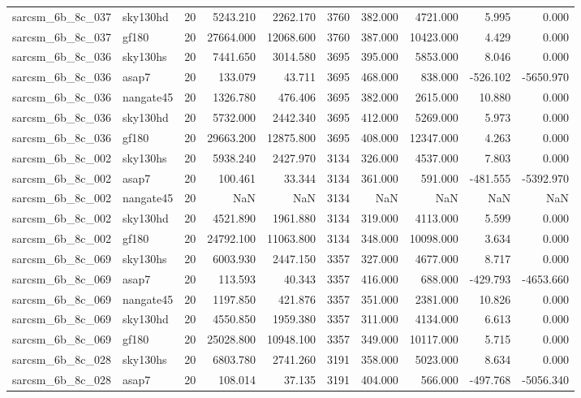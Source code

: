 \begin{longtable}{llrrrrrrrr}
sarcsm\_6b\_8c\_037 & sky130hd & 20 & 5243.210 & 2262.170 & 3760 & 382.000 & 4721.000 & 5.995 & 0.000 \\
sarcsm\_6b\_8c\_037 & gf180 & 20 & 27664.000 & 12068.600 & 3760 & 387.000 & 10423.000 & 4.429 & 0.000 \\
sarcsm\_6b\_8c\_036 & sky130hs & 20 & 7441.650 & 3014.580 & 3695 & 395.000 & 5853.000 & 8.046 & 0.000 \\
sarcsm\_6b\_8c\_036 & asap7 & 20 & 133.079 & 43.711 & 3695 & 468.000 & 838.000 & -526.102 & -5650.970 \\
sarcsm\_6b\_8c\_036 & nangate45 & 20 & 1326.780 & 476.406 & 3695 & 382.000 & 2615.000 & 10.880 & 0.000 \\
sarcsm\_6b\_8c\_036 & sky130hd & 20 & 5732.000 & 2442.340 & 3695 & 412.000 & 5269.000 & 5.973 & 0.000 \\
sarcsm\_6b\_8c\_036 & gf180 & 20 & 29663.200 & 12875.800 & 3695 & 408.000 & 12347.000 & 4.263 & 0.000 \\
sarcsm\_6b\_8c\_002 & sky130hs & 20 & 5938.240 & 2427.970 & 3134 & 326.000 & 4537.000 & 7.803 & 0.000 \\
sarcsm\_6b\_8c\_002 & asap7 & 20 & 100.461 & 33.344 & 3134 & 361.000 & 591.000 & -481.555 & -5392.970 \\
sarcsm\_6b\_8c\_002 & nangate45 & 20 & NaN & NaN & 3134 & NaN & NaN & NaN & NaN \\
sarcsm\_6b\_8c\_002 & sky130hd & 20 & 4521.890 & 1961.880 & 3134 & 319.000 & 4113.000 & 5.599 & 0.000 \\
sarcsm\_6b\_8c\_002 & gf180 & 20 & 24792.100 & 11063.800 & 3134 & 348.000 & 10098.000 & 3.634 & 0.000 \\
sarcsm\_6b\_8c\_069 & sky130hs & 20 & 6003.930 & 2447.150 & 3357 & 327.000 & 4677.000 & 8.717 & 0.000 \\
sarcsm\_6b\_8c\_069 & asap7 & 20 & 113.593 & 40.343 & 3357 & 416.000 & 688.000 & -429.793 & -4653.660 \\
sarcsm\_6b\_8c\_069 & nangate45 & 20 & 1197.850 & 421.876 & 3357 & 351.000 & 2381.000 & 10.826 & 0.000 \\
sarcsm\_6b\_8c\_069 & sky130hd & 20 & 4550.850 & 1959.380 & 3357 & 311.000 & 4134.000 & 6.613 & 0.000 \\
sarcsm\_6b\_8c\_069 & gf180 & 20 & 25028.800 & 10948.100 & 3357 & 349.000 & 10117.000 & 5.715 & 0.000 \\
sarcsm\_6b\_8c\_028 & sky130hs & 20 & 6803.780 & 2741.260 & 3191 & 358.000 & 5023.000 & 8.634 & 0.000 \\
sarcsm\_6b\_8c\_028 & asap7 & 20 & 108.014 & 37.135 & 3191 & 404.000 & 566.000 & -497.768 & -5056.340 \\

\end{longtable}
